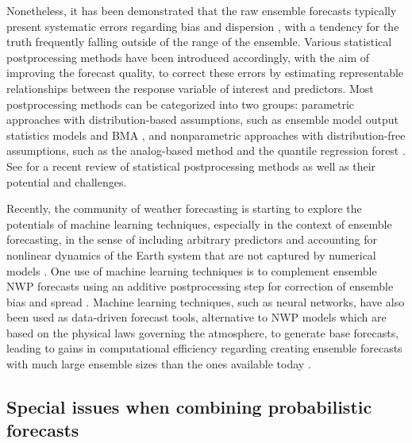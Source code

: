 \documentclass[11pt]{article}
\begin{document}
Nonetheless, it has been demonstrated that the raw ensemble forecasts typically present systematic errors regarding bias \citep{Atger2003-lx,Mass2003-bc} and dispersion \citep{Buizza2005-wf,Sloughter2010-ae}, with a tendency for the truth frequently falling outside of the range of the ensemble. Various statistical postprocessing methods have been introduced accordingly, with the aim of improving the forecast quality, to correct these errors by estimating representable relationships between the response variable of interest and predictors. Most postprocessing methods can be categorized into two groups: parametric approaches with distribution-based assumptions, such as ensemble model output statistics \citep[EMOS,][]{Gneiting2005-ua} models and BMA \citep{Raftery2005-xi}, and nonparametric approaches with distribution-free assumptions, such as the analog-based method \citep[e.g.,][]{Delle_Monache2013-os} and the quantile regression forest \citep{Taillardat2019-ni}. See \citet{Vannitsem2021-bg} for a recent review of statistical postprocessing methods as well as their potential and challenges.

Recently, the community of weather forecasting is starting to explore the potentials of machine learning techniques, especially in the context of ensemble forecasting, in the sense of including arbitrary predictors and accounting for nonlinear dynamics of the Earth system that are not captured by numerical models \citep{Dueben2021-fe}. One use of machine learning techniques is to complement ensemble NWP \citep[numerical weather prediction, see, e.g.,][for a summary of its revolution]{Bauer2015-dg,Benjamin2019-zp} forecasts using an additive postprocessing step for correction of ensemble bias and spread \citep{Rasp2018-zu,Scher2018-dm,Gronquist2021-no}. Machine learning techniques, such as neural networks, have also been used as data-driven forecast tools, alternative to NWP models which are based on the physical laws governing the atmosphere, to generate base forecasts, leading to gains in computational efficiency regarding creating ensemble forecasts with much large ensemble sizes than the ones available today \citep{Dueben2018-ln,Scher2018-of,Rasp2021-az,Scher2021-ee}.

\subsection{Special issues when combining probabilistic forecasts}
\label{sec:issues}
\end{document}
